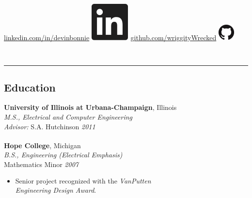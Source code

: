 \documentclass{article}
\begin{document}
{\begin{minipage}[t]{0.33\textwidth}
\begin{flushright}
 \vspace{1px}
\linebreak
\href{https://www.linkedin.com/in/devinbonnie}{linkedin.com/in/devinbonnie} \space\space \includegraphics[scale=0.40]{linkedin}\hspace{.9px}
\linebreak
\href{https://github.com/wriggityWrecked}{github.com/wriggityWrecked} \space\space \includegraphics[scale=0.225]{GitHub-Mark-32px}\hspace{1px}
\linebreak
\end{flushright}
\end{minipage}
%
\\
\textcolor{lightGray}{\rule{542px}{0.4pt}}

\setlength{\columnsep}{32.5px}
\begin{multicols}{2}
%
%
\section*{Education}
\noindent \textbf{University of Illinois at Urbana-Champaign}, Illinois\\
\textsl{M.S., Electrical and Computer Engineering}\\
\textsl{Advisor:} S.A. Hutchinson \hfill \textsl{2011}\\\vspace{0px}\\
\noindent \textbf{Hope College}, Michigan\\
\textsl{B.S., Engineering (Electrical Emphasis)}\\
Mathematics Minor \hfill \textsl{2007}\\
    \vspace{ -10px}
    \begin{itemize}[noitemsep,nolistsep]
        \item Senior project recognized with the \textit{VanPutten\\ Engineering Design Award}.
    \end{itemize}
    \vspace{5px}

\end{multicols}}
\end{document}
